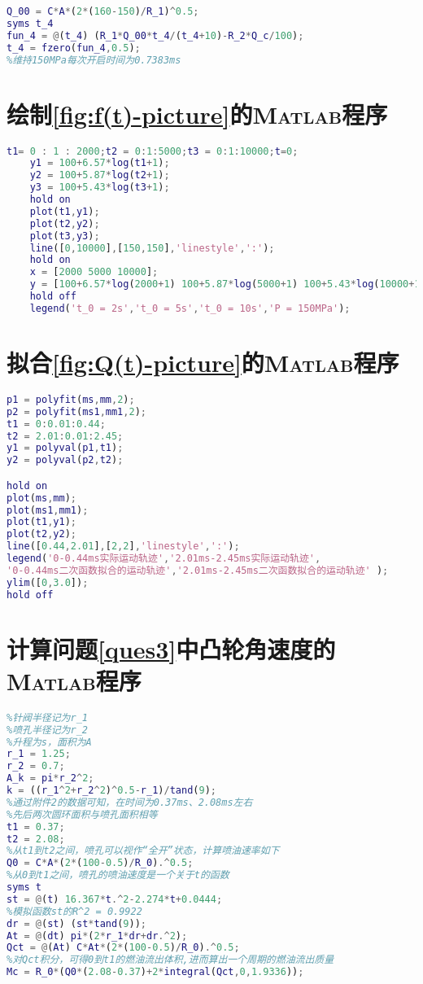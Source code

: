 \documentclass[withoutpreface,bwprint]{cumcmthesis} %
\begin{document}
\begin{appendices}
\begin{lstlisting}[language=matlab]
%维持150MPa所需的开启时长
Q_00 = C*A*(2*(160-150)/R_1)^0.5;
syms t_4
fun_4 = @(t_4) (R_1*Q_00*t_4/(t_4+10)-R_2*Q_c/100);
t_4 = fzero(fun_4,0.5);
%维持150MPa每次开启时间为0.7383ms
\end{lstlisting}
\section{绘制\cref{fig:f(t)-picture}的\textsc{Matlab}程序}
\begin{lstlisting}[language=matlab]
	t1= 0 : 1 : 2000;t2 = 0:1:5000;t3 = 0:1:10000;t=0;
	y1 = 100+6.57*log(t1+1);
	y2 = 100+5.87*log(t2+1);
	y3 = 100+5.43*log(t3+1);
	hold on
	plot(t1,y1);
	plot(t2,y2);
	plot(t3,y3);
	line([0,10000],[150,150],'linestyle',':');
	hold on
	x = [2000 5000 10000];
	y = [100+6.57*log(2000+1) 100+5.87*log(5000+1) 100+5.43*log(10000+1)];
	hold off
	legend('t_0 = 2s','t_0 = 5s','t_0 = 10s','P = 150MPa');
\end{lstlisting}

\section{拟合\cref{fig:Q(t)-picture}的\textsc{Matlab}程序}
\begin{lstlisting}[language=matlab]
p1 = polyfit(ms,mm,2);
p2 = polyfit(ms1,mm1,2);
t1 = 0:0.01:0.44;
t2 = 2.01:0.01:2.45;
y1 = polyval(p1,t1);
y2 = polyval(p2,t2);

hold on
plot(ms,mm);
plot(ms1,mm1);
plot(t1,y1);
plot(t2,y2);
line([0.44,2.01],[2,2],'linestyle',':');
legend('0-0.44ms实际运动轨迹','2.01ms-2.45ms实际运动轨迹',
'0-0.44ms二次函数拟合的运动轨迹','2.01ms-2.45ms二次函数拟合的运动轨迹' );
ylim([0,3.0]);
hold off
\end{lstlisting}

\section{计算问题\ref{ques3}中凸轮角速度的\textsc{Matlab}程序}
\begin{lstlisting}[language=matlab]
%%第二题
%针阀半径记为r_1
%喷孔半径记为r_2
%升程为s，面积为A
r_1 = 1.25;
r_2 = 0.7;
A_k = pi*r_2^2;
k = ((r_1^2+r_2^2)^0.5-r_1)/tand(9);
%通过附件2的数据可知，在时间为0.37ms、2.08ms左右
%先后两次圆环面积与喷孔面积相等
t1 = 0.37;
t2 = 2.08;
%从t1到t2之间，喷孔可以视作“全开”状态，计算喷油速率如下
Q0 = C*A*(2*(100-0.5)/R_0).^0.5;
%从0到t1之间，喷孔的喷油速度是一个关于t的函数
syms t
st = @(t) 16.367*t.^2-2.274*t+0.0444;
%模拟函数st的R^2 = 0.9922
dr = @(st) (st*tand(9));
At = @(dt) pi*(2*r_1*dr+dr.^2);
Qct = @(At) C*At*(2*(100-0.5)/R_0).^0.5;
%对Qct积分，可得0到t1的燃油流出体积,进而算出一个周期的燃油流出质量
Mc = R_0*(Q0*(2.08-0.37)+2*integral(Qct,0,1.9336));


\end{lstlisting}
\end{appendices}
\end{document}
